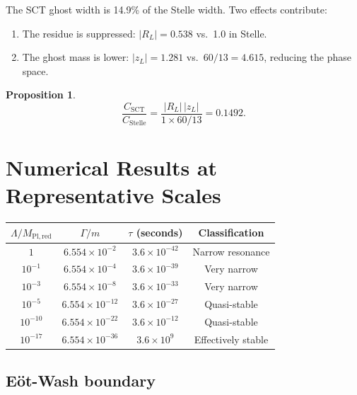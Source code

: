 \documentclass[11pt,a4paper]{article}
\newcommand{\MPlred}{M_{\mathrm{Pl,red}}}
\newtheorem{proposition}[theorem]{Proposition}
\begin{document}
\noindent
The SCT ghost width is 14.9\% of the Stelle width.  Two effects
contribute:
\begin{enumerate}[nosep]
  \item The residue is suppressed: $|R_L| = 0.538$ vs.~1.0 in Stelle.
  \item The ghost mass is lower: $|z_L| = 1.281$ vs.~$60/13 = 4.615$,
    reducing the phase space.
\end{enumerate}

\begin{proposition}
\begin{equation}
  \frac{C_{\mathrm{SCT}}}{C_{\mathrm{Stelle}}}
  = \frac{|R_L|\,|z_L|}{1 \times 60/13}
  = 0.1492.
\end{equation}
\end{proposition}


\section{Numerical Results at Representative Scales}
\label{sec:scales}

\begin{center}
\begin{tabular}{cccc}
\toprule
$\Lambda/\MPlred$ & $\Gamma/m$ & $\tau$ (seconds) &
  Classification \\
\midrule
$1$ & $6.554 \times 10^{-2}$ & $3.6 \times 10^{-42}$ &
  Narrow resonance \\
$10^{-1}$ & $6.554 \times 10^{-4}$ & $3.6 \times 10^{-39}$ &
  Very narrow \\
$10^{-3}$ & $6.554 \times 10^{-8}$ & $3.6 \times 10^{-33}$ &
  Very narrow \\
$10^{-5}$ & $6.554 \times 10^{-12}$ & $3.6 \times 10^{-27}$ &
  Quasi-stable \\
$10^{-10}$ & $6.554 \times 10^{-22}$ & $3.6 \times 10^{-12}$ &
  Quasi-stable \\
$10^{-17}$ & $6.554 \times 10^{-36}$ & $3.6 \times 10^{9}$ &
  Effectively stable \\
\bottomrule
\end{tabular}
\end{center}

\subsection{E\"ot-Wash boundary}
\end{document}
